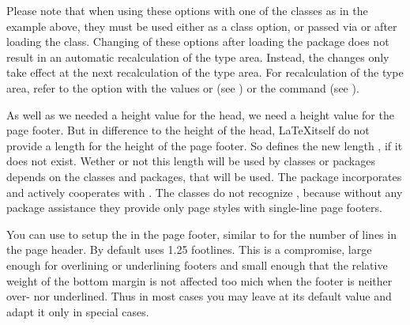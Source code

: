 Please note that when using these options with one of the
{\KOMAScript} classes as in the example above, they must be used
either as a class option, or passed via  or
 after loading the class. Changing of these options
after loading the  package does not result in an
automatic recalculation of the type area. Instead, the changes only
take effect at the next recalculation of the type area. For
recalculation of the type area, refer to the  option with
the values  or  (see
) or the
 command (see
).%
%
\EndIndexGroup


\begin{Declaration}
\end{Declaration}
As well as we needed a height value for
the head, we need a height value for the page footer. But in difference to the
height of the head, \LaTeX itself do not provide a length for the height of
the page footer. So  defines the new length
, if
it does not exist. Wether or not this length will be used by classes or
packages depends on the classes and packages, that will be used. The
\KOMAScript{} package  incorporates
 and actively cooperates with
. The \KOMAScript{} classes do not recognize
, because without any package assistance
they provide only page styles with single-line page footers.

You can use  to setup the  in the
page footer, similar to  for the number
of lines in the page header. By default  uses 1.25
footlines. This is a compromise, large enough for overlining or underlining
footers and small enough that the relative weight of the bottom margin is not
affected too mich when the footer is neither over- nor underlined. Thus in
most cases you may leave  at its default value and
adapt it only in special cases.

